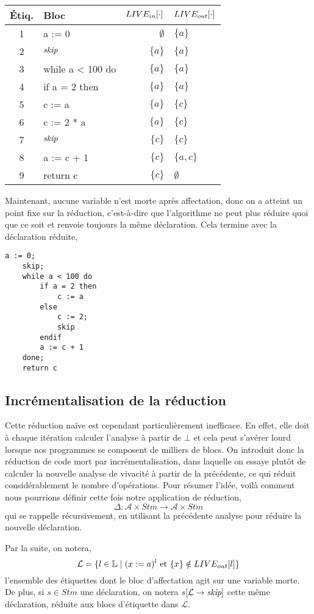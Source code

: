\documentclass[a4paper, 10pt]{article}
\begin{document}
\begin{example}
\begin{center}
\begin{tabular}{||c|l|r|l||}
	\hline
	Étiq. & Bloc & $LIVE_{in}[\cdot]$ & $LIVE_{out}[\cdot]$ \\
	\hline
	1 & a := 0 & $\emptyset$ & $\{a\}$\\
	2 & $\textit{skip}$ & $\{a\}$ & $\{a\}$\\
	3 & while a < 100 do & $\{a\}$ & $\{a\}$\\
	4 & if a = 2 then & $\{a\}$ & $\{a\}$\\
	5 & c := a & $\{a\}$ & $\{c\}$\\
	6 & c := 2 * a & $\{a\}$ & $\{c\}$\\
	7 & $\textit{skip}$ & $\{c\}$ & $\{c\}$\\
	8 & a := c + 1 & $\{c\}$ & $\{a, c\}$\\
	9 & return c & $\{c\}$ & $\emptyset$\\
	\hline
	\end{tabular}
\end{center}
Maintenant, aucune variable n'est morte après affectation, donc on a atteint un point fixe
sur la réduction, c'est-à-dire que l'algorithme ne peut plus réduire quoi que ce soit et renvoie
toujours la même déclaration. Cela termine avec la déclaration réduite,
\begin{lstlisting}[tabsize=2]
	a := 0;
	skip;
	while a < 100 do
		if a = 2 then
			c := a
		else
			c := 2;
			skip
		endif
		a := c + 1
	done;
	return c
\end{lstlisting}
\end{example}
\subsection{Incrémentalisation de la réduction}
Cette réduction naïve est cependant particulièrement inefficace. En effet, elle doit à chaque itération calculer
l'analyse à partir de $\bot$ et cela peut s'avérer lourd lorsque nos programmes se composent de milliers de blocs.
On introduit donc la réduction de code mort par incrémentalisation, dans laquelle on essaye plutôt de calculer
la nouvelle analyse de vivacité à partir de la précédente, ce qui réduit considérablement le nombre d'opérations.
Pour résumer l'idée, voilà comment nous pourrions définir cette fois notre application de réduction,
\[\Delta : \mathcal{A} \times Stm \longrightarrow \mathcal{A} \times Stm \]
qui se rappelle récursivement, en utilisant la précédente analyse pour réduire la nouvelle déclaration.
\\
\begin{notation}
	Par la suite, on notera,
	\[
		\mathcal{L} = \{l \in \mathbb{L} \mid (x := a)^l \text{ et } \{x\} \notin LIVE_{out}[l]\}	
	\]
	l'ensemble des étiquettes dont le bloc d'affectation agit sur une variable morte.
	De plus, si $s \in Stm$ une déclaration, on notera $s[\mathcal{L} \rightarrow{ \textit{skip} }]$ cette même déclaration, 
	réduite aux blocs d'étiquette dans $\mathcal{L}$.
\end{notation}
\end{document}
